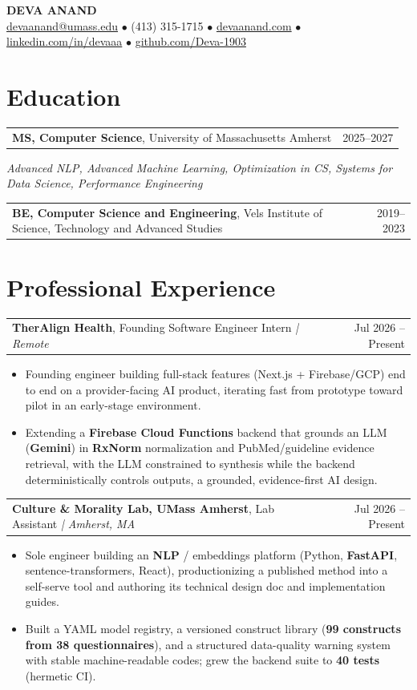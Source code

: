 \documentclass[letterpaper,11pt]{article}
\makeatletter
\newcommand{\eduItem}[3]{%
  \begin{tabular*}{\textwidth}{@{}l@{\extracolsep{\fill}}r@{}}
    \textbf{#1}, #2 & #3 \\
  \end{tabular*}\par
}
\newcommand{\expItem}[4]{%
  \vspace{2pt}
  \begin{tabular*}{\textwidth}{@{}l@{\extracolsep{\fill}}r@{}}
    \textbf{#1}, #2 \textit{| #3} & #4 \\
  \end{tabular*}\par\vspace{-3pt}
}
\makeatother
\begin{document}
\begin{center}
    {\fontsize{18}{20}\selectfont\bfseries DEVA ANAND}\\ \vspace{3pt}
    {\small
    \href{mailto:devaanand@umass.edu}{devaanand@umass.edu}
    \enspace$\bullet$\enspace
    (413) 315-1715
    \enspace$\bullet$\enspace
    \href{https://devaanand.com}{devaanand.com}
    \enspace$\bullet$\enspace
    \href{https://linkedin.com/in/devaaa/}{linkedin.com/in/devaaa}
    \enspace$\bullet$\enspace
    \href{https://github.com/Deva-1903}{github.com/Deva-1903}}
\end{center}
\vspace{-8pt}

\section{Education}
\eduItem{MS, Computer Science}{University of Massachusetts Amherst}{2025--2027}
{\small\textit{Advanced NLP, Advanced Machine Learning, Optimization in CS, Systems for Data Science, Performance Engineering}}\par
\vspace{3pt}
\eduItem{BE, Computer Science and Engineering}{Vels Institute of Science, Technology and Advanced Studies}{2019--2023}

\section{Professional Experience}

\expItem{TherAlign Health}{Founding Software Engineer Intern}{Remote}{Jul 2026 -- Present}
\begin{itemize}
  \item Founding engineer building full-stack features (Next.js + Firebase/GCP) end to end on a provider-facing AI product, iterating fast from prototype toward pilot in an early-stage environment.
  \item Extending a \textbf{Firebase Cloud Functions} backend that grounds an LLM (\textbf{Gemini}) in \textbf{RxNorm} normalization and PubMed/guideline evidence retrieval, with the LLM constrained to synthesis while the backend deterministically controls outputs, a grounded, evidence-first AI design.
\end{itemize}

\expItem{Culture \& Morality Lab, UMass Amherst}{Lab Assistant}{Amherst, MA}{Jul 2026 -- Present}
\begin{itemize}
  \item Sole engineer building an \textbf{NLP} / embeddings platform (Python, \textbf{FastAPI}, sentence-transformers, React), productionizing a published method into a self-serve tool and authoring its technical design doc and implementation guides.
  \item Built a YAML model registry, a versioned construct library (\textbf{99 constructs from 38 questionnaires}), and a structured data-quality warning system with stable machine-readable codes; grew the backend suite to \textbf{40 tests} (hermetic CI).
\end{itemize}
\end{document}
